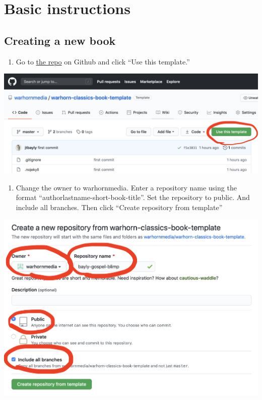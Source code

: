 \documentclass[
]{book}
\providecommand{\tightlist}{%
  \setlength{\itemsep}{0pt}\setlength{\parskip}{0pt}}
\begin{document}
\hypertarget{basic-instructions}{%
\chapter{Basic instructions}\label{basic-instructions}}

\hypertarget{creating-a-new-book}{%
\section{Creating a new book}\label{creating-a-new-book}}

\begin{enumerate}
\def\labelenumi{\arabic{enumi}.}
\tightlist
\item
  Go to \href{https://github.com/warhornmedia/warhorn-classics-book-template}{the repo} on Github and click ``Use this template.''
\end{enumerate}

\begin{center}\includegraphics[width=0.65\linewidth]{images/screenshot1} \end{center}

\begin{enumerate}
\def\labelenumi{\arabic{enumi}.}
\setcounter{enumi}{1}
\tightlist
\item
  Change the owner to warhornmedia. Enter a repository name using the format ``authorlastname-short-book-title''. Set the repository to public. And include all branches. Then click ``Create repository from template''
\end{enumerate}

\begin{center}\includegraphics[width=0.65\linewidth]{images/screenshot2} \end{center}
\end{document}
